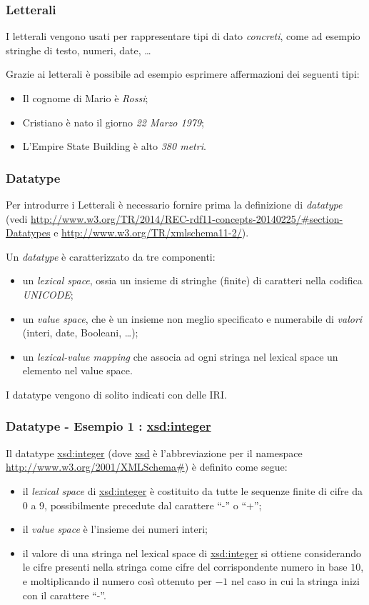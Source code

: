 \documentclass[8pt]{beamer}
\begin{document}
\begin{frame}
\frametitle{Letterali}

I letterali vengono usati per rappresentare tipi di dato \emph{concreti},
come ad esempio stringhe di testo, numeri, date, \ldots
\vspace{\baselineskip}

Grazie ai letterali \`e possibile ad esempio esprimere affermazioni dei seguenti tipi:
\begin{itemize}
 \item Il cognome di Mario \`e \emph{Rossi};
 \item Cristiano \`e nato il giorno \emph{22 Marzo 1979};
 \item L'Empire State Building \`e alto \emph{380 metri}.
\end{itemize}
\end{frame}

\begin{frame}
\frametitle{Datatype}
Per introdurre i Letterali \`e necessario fornire prima la definizione di \emph{datatype}
(vedi \url{http://www.w3.org/TR/2014/REC-rdf11-concepts-20140225/\#section-Datatypes} e 
\url{http://www.w3.org/TR/xmlschema11-2/}).
\vspace{\baselineskip}

Un \emph{datatype} \`e caratterizzato da tre componenti:
\begin{itemize}
 \item un \emph{lexical space}, ossia un insieme di stringhe (finite) di caratteri nella codifica \emph{UNICODE};
 \item un \emph{value space}, che \`e un insieme non meglio specificato e numerabile di \emph{valori} (interi, date,
 Booleani, \ldots);
 \item un \emph{lexical-value mapping} che associa ad ogni stringa nel lexical space un elemento nel value space.
\end{itemize}
\vspace{\baselineskip}

I datatype vengono di solito indicati con delle IRI.
\end{frame}

\begin{frame}
\frametitle{Datatype - Esempio 1 : \url{xsd:integer}}
Il datatype \url{xsd:integer} (dove \url{xsd} \`e l'abbreviazione per il namespace \url{http://www.w3.org/2001/XMLSchema\#})
\`e definito come segue:

\begin{itemize}
 \item il \emph{lexical space} di \url{xsd:integer} \`e costituito da tutte le sequenze finite di cifre da 0 a 9, possibilmente
 precedute dal carattere ``-'' o ``+'';
 \item il \emph{value space} \`e l'insieme dei numeri interi;
 \item il valore di una stringa nel lexical space di \url{xsd:integer} si ottiene considerando le cifre 
 presenti nella stringa come cifre del corrispondente numero in base $10$, e moltiplicando il numero cos\`i ottenuto per
 $-1$ nel caso in cui la stringa inizi con il carattere ``-''.
\end{itemize}
\end{frame}
\end{document}
